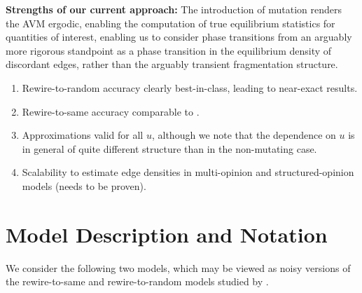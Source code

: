 \documentclass[english]{scrartcl}
\begin{document}
	\textbf{Strengths of our current approach:}
		The introduction of mutation renders the AVM ergodic, enabling the computation of true equilibrium statistics for quantities of interest, enabling us to consider phase transitions from an arguably more rigorous standpoint as a phase transition in the equilibrium density of discordant edges, rather than the arguably transient fragmentation structure. 
	\begin{enumerate}
		\item Rewire-to-random accuracy clearly best-in-class, leading to near-exact results. 
		\item Rewire-to-same accuracy comparable to \cite{Demirel2012}.
		\item Approximations valid for all $u$, although we note that the dependence on $u$ is in general of quite different structure than in the non-mutating case. 
		\item Scalability to estimate edge densities in multi-opinion and structured-opinion models (needs to be proven).
	\end{enumerate}



\section{Model Description and Notation}
	
	We consider the following two models, which may be viewed as noisy versions of the rewire-to-same and rewire-to-random models studied by \cite{Durrett2012}. 
\end{document}
